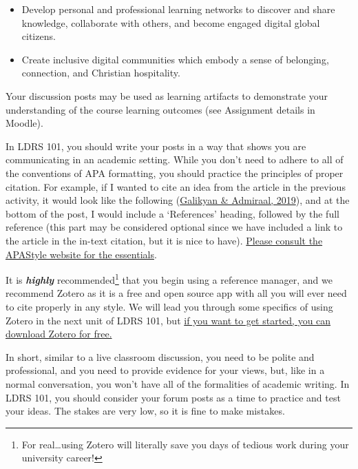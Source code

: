 \documentclass[
]{book}
\providecommand{\tightlist}{%
  \setlength{\itemsep}{0pt}\setlength{\parskip}{0pt}}
\theoremstyle{definition}
\theoremstyle{definition}
\theoremstyle{definition}
\theoremstyle{definition}
\theoremstyle{remark}
\begin{document}
\begin{itemize}
\tightlist
\item
  Develop personal and professional learning networks to discover and share knowledge, collaborate with others, and become engaged digital global citizens.\\
\item
  Create inclusive digital communities which embody a sense of belonging, connection, and Christian hospitality.
\end{itemize}

Your discussion posts may be used as learning artifacts to demonstrate your understanding of the course learning outcomes (see Assignment details in Moodle).

In LDRS 101, you should write your posts in a way that shows you are communicating in an academic setting. While you don't need to adhere to all of the conventions of APA formatting, you should practice the principles of proper citation. For example, if I wanted to cite an idea from the article in the previous activity, it would look like the following (\href{https://eds-p-ebscohost-com.twu.idm.oclc.org/eds/detail/detail?vid=1\&sid=1ed25c6c-b7f3-47b9-8ea3-249c74d9335c\%40redis\&bdata=JnNpdGU9ZWRzLWxpdmUmc2NvcGU9c2l0ZQ\%3d\%3d\#}{Galikyan \& Admiraal, 2019}), and at the bottom of the post, I would include a `References' heading, followed by the full reference (this part may be considered optional since we have included a link to the article in the in-text citation, but it is nice to have). \href{https://apastyle.apa.org/style-grammar-guidelines}{Please consult the APAStyle website for the essentials}.

It is \textbf{\emph{highly}} recommended\footnote{For real\ldots using Zotero will literally save you days of tedious work during your university career!} that you begin using a reference manager, and we recommend Zotero as it is a free and open source app with all you will ever need to cite properly in any style. We will lead you through some specifics of using Zotero in the next unit of LDRS 101, but \href{https://www.zotero.org/}{if you want to get started, you can download Zotero for free.}

In short, similar to a live classroom discussion, you need to be polite and professional, and you need to provide evidence for your views, but, like in a normal conversation, you won't have all of the formalities of academic writing. In LDRS 101, you should consider your forum posts as a time to practice and test your ideas. The stakes are very low, so it is fine to make mistakes.
\end{document}
